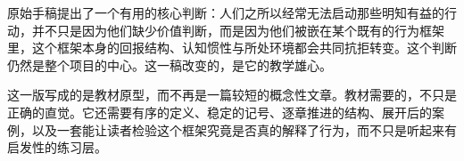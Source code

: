 原始手稿提出了一个有用的核心判断：人们之所以经常无法启动那些明知有益的行动，并不只是因为他们缺少价值判断，而是因为他们被嵌在某个既有的行为框架里，这个框架本身的回报结构、认知惯性与所处环境都会共同抗拒转变。这个判断仍然是整个项目的中心。这一稿改变的，是它的教学雄心。

这一版写成的是教材原型，而不再是一篇较短的概念性文章。教材需要的，不只是正确的直觉。它还需要有序的定义、稳定的记号、逐章推进的结构、展开后的案例，以及一套能让读者检验这个框架究竟是否真的解释了行为，而不只是听起来有启发性的练习层。